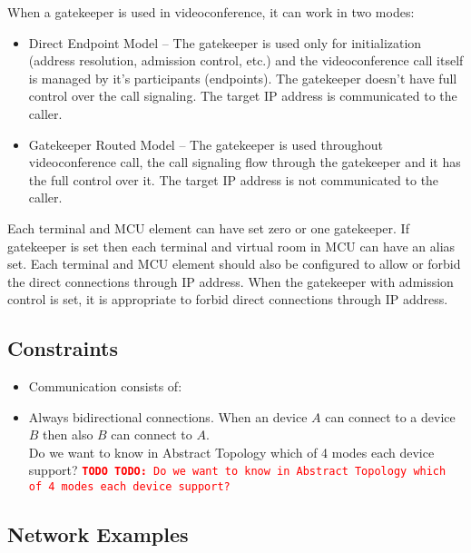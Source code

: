 \documentclass[a4paper]{report}
\newcommand{\TODO}[1]{%
\def\empty{}%
\def\prvniparametr{#1}%
\ifx\prvniparametr\empty%
\begingroup\tt\textcolor{red}{\noindent\textbf{TODO}}\endgroup
\else%
\begingroup\tt\textcolor{red}{\noindent\textbf{TODO:}\ #1}\endgroup
\fi%
}
\begin{document}
When a gatekeeper is used in videoconference, it can work in two modes:
\begin{itemize}
\item Direct Endpoint Model -- The gatekeeper is used only for initialization (address resolution, admission control, etc.) and the videoconference call itself is managed by it's participants (endpoints). The gatekeeper doesn't have full control over the call signaling. The target IP address is communicated to the caller.
\item Gatekeeper Routed Model -- The gatekeeper is used throughout videoconference call, the call signaling flow through the gatekeeper and it has the full control over it. The target IP address is not communicated to the caller.
\end{itemize}

Each terminal and MCU element can have set zero or one gatekeeper. If gatekeeper is set then each terminal and virtual room in MCU can have an alias set. Each terminal and MCU element should also be configured to allow or forbid the direct connections through IP address. When the gatekeeper with admission control is set, it is appropriate to forbid direct connections through IP address.

\subsection{Constraints}

\begin{itemize}

\item Communication consists of:

\item Always bidirectional connections. When an device $A$ can connect to a device $B$ then also $B$ can connect to $A$.
\\ \TODO{Do we want to know in Abstract Topology which of 4 modes each device support?}

\end{itemize}

\subsection{Network Examples}
\end{document}
